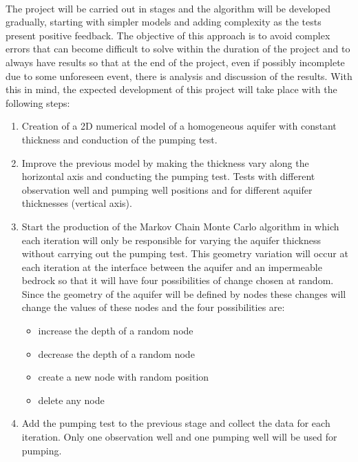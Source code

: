 \documentclass[11pt, a4paper]{article}
\begin{document}
    \paragraph{} %
    The project will be carried out in stages and the algorithm will be developed gradually, starting with simpler models and adding complexity as the tests present positive feedback. The objective of this approach is to avoid complex errors that can become difficult to solve within the duration of the project and to always have results so that at the end of the project, even if possibly incomplete due to some unforeseen event, there is analysis and discussion of the results. With this in mind, the expected development of this project will take place with the following steps:
        \begin{enumerate}
            \item Creation of a 2D numerical model of a homogeneous aquifer with constant thickness and conduction of the pumping test.
            \item Improve the previous model by making the thickness vary along the horizontal axis and conducting the pumping test. Tests with different observation well and pumping well positions and for different aquifer thicknesses (vertical axis).
            \item Start the production of the Markov Chain Monte Carlo algorithm in which each iteration will only be responsible for varying the aquifer thickness without carrying out the pumping test. This geometry variation will occur at each iteration at the interface between the aquifer and an impermeable bedrock so that it will have four possibilities of change chosen at random. Since the geometry of the aquifer will be defined by nodes these changes will change the values of these nodes and the four possibilities are:
            \begin{itemize}
                \item increase the depth of a random node
                \item decrease the depth of a random node
                \item create a new node with random position
                \item delete any node
            \end{itemize}
            \item Add the pumping test to the previous stage and collect the data for each iteration. Only one observation well and one pumping well will be used for pumping.

\end{enumerate}
\end{document}
